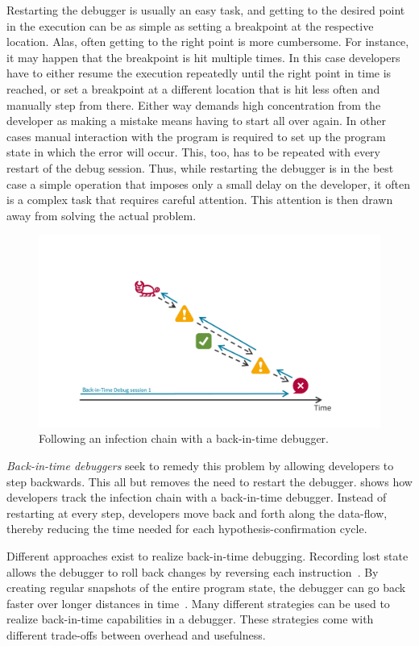 Restarting the debugger is usually an easy task, and getting to the desired point in the execution can be as simple as setting a breakpoint at the respective location.
Alas, often getting to the right point is more cumbersome.
For instance, it may happen that the breakpoint is hit multiple times.
In this case developers have to either resume the execution repeatedly until the right point in time is reached, or set a breakpoint at a different location that is hit less often and manually step from there.
Either way demands high concentration from the developer as making a mistake means having to start all over again.
In other cases manual interaction with the program is required to set up the program state in which the error will occur.
This, too, has to be repeated with every restart of the debug session.
Thus, while restarting the debugger is in the best case a simple operation that imposes only a small delay on the developer, it often is a complex task that requires careful attention.
This attention is then drawn away from solving the actual problem.

\begin{figure}[th]
\centering
\includegraphics[width=.9\linewidth]{img/workflow-odb}
\caption{Following an infection chain with a back-in-time debugger.}
\label{fig:workflow-odb}
\end{figure}

\emph{Back-in-time debuggers} seek to remedy this problem by allowing developers to step backwards.
This all but removes the need to restart the debugger.
 shows how developers track the infection chain with a back-in-time debugger.
Instead of restarting at every step, developers move back and forth along the data-flow, thereby reducing the time needed for each hypothesis-confirmation cycle.

Different approaches exist to realize back-in-time debugging.
Recording lost state allows the debugger to roll back changes by reversing each instruction~\cite{feldman88:igor_a_system,cook02:reverse_execution_of_java,lieberman95:zstep_95_a_reversible}.
By creating regular snapshots of the entire program state, the debugger can go back faster over longer distances in time~\cite{boothe00:efficient_algorithms_for_bidirectional,tolmach93:a_debugger_for_standard}.
Many different strategies can be used to realize back-in-time capabilities in a debugger.
These strategies come with different trade-offs between overhead and usefulness.

